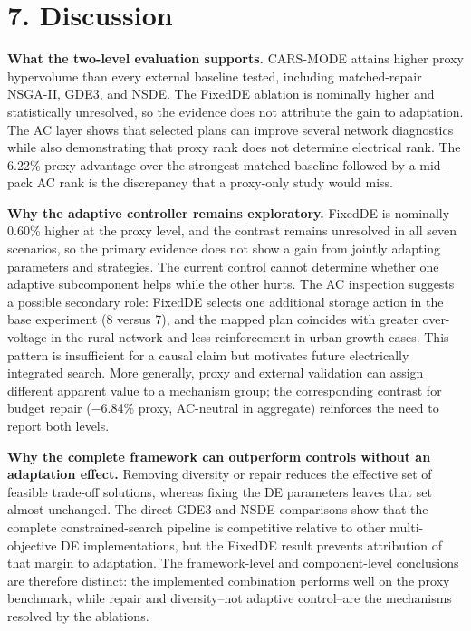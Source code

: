 \documentclass[
  10pt,
  a4paper,
]{article}
\begin{document}
\section{7. Discussion}\label{discussion}

\textbf{What the two-level evaluation supports.} CARS-MODE attains
higher proxy hypervolume than every external baseline tested, including
matched-repair NSGA-II, GDE3, and NSDE. The FixedDE ablation is
nominally higher and statistically unresolved, so the evidence does not
attribute the gain to adaptation. The AC layer shows that selected plans
can improve several network diagnostics while also demonstrating that
proxy rank does not determine electrical rank. The 6.22\% proxy
advantage over the strongest matched baseline followed by a mid-pack AC
rank is the discrepancy that a proxy-only study would miss.

\textbf{Why the adaptive controller remains exploratory.} FixedDE is
nominally 0.60\% higher at the proxy level, and the contrast remains
unresolved in all seven scenarios, so the primary evidence does not show
a gain from jointly adapting parameters and strategies. The current
control cannot determine whether one adaptive subcomponent helps while
the other hurts. The AC inspection suggests a possible secondary role:
FixedDE selects one additional storage action in the base experiment (8
versus 7), and the mapped plan coincides with greater over-voltage in
the rural network and less reinforcement in urban growth cases. This
pattern is insufficient for a causal claim but motivates future
electrically integrated search. More generally, proxy and external
validation can assign different apparent value to a mechanism group; the
corresponding contrast for budget repair (−6.84\% proxy, AC-neutral in
aggregate) reinforces the need to report both levels.

\textbf{Why the complete framework can outperform controls without an
adaptation effect.} Removing diversity or repair reduces the effective
set of feasible trade-off solutions, whereas fixing the DE parameters
leaves that set almost unchanged. The direct GDE3 and NSDE comparisons
show that the complete constrained-search pipeline is competitive
relative to other multi-objective DE implementations, but the FixedDE
result prevents attribution of that margin to adaptation. The
framework-level and component-level conclusions are therefore distinct:
the implemented combination performs well on the proxy benchmark, while
repair and diversity--not adaptive control--are the mechanisms resolved
by the ablations.
\end{document}
